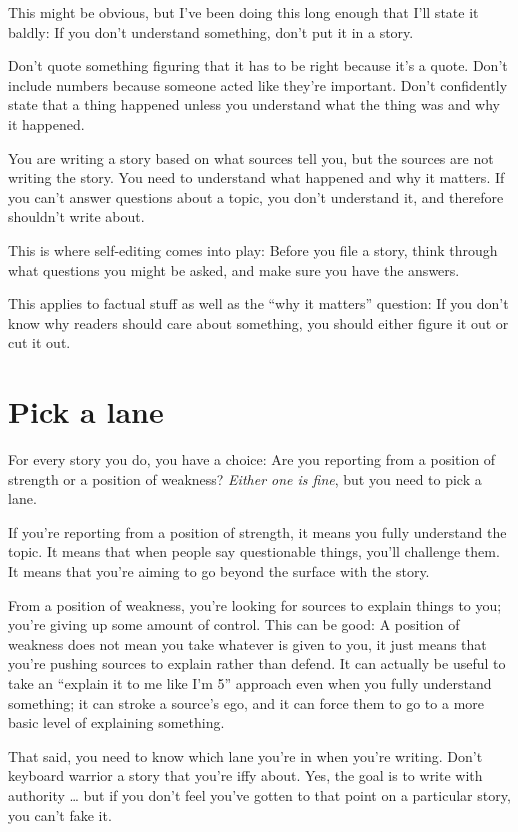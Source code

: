 \documentclass[
  11pt,
  american,
  letterpaperpaper,
  extrafontsizes,onecolumn,openright
  ]{memoir}
\newlength{\rf}
\begin{document}
This might be obvious, but I've been doing this long enough that I'll state it baldly: If you don't understand something, don't put it in a story.

Don't quote something figuring that it has to be right because it's a quote. Don't include numbers because someone acted like they're important. Don't confidently state that a thing happened unless you understand what the thing was and why it happened.

You are writing a story based on what sources tell you, but the sources are not writing the story. You need to understand what happened and why it matters. If you can't answer questions about a topic, you don't understand it, and therefore shouldn't write about.

This is where self-editing comes into play: Before you file a story, think through what questions you might be asked, and make sure you have the answers.

This applies to factual stuff as well as the \enquote{why it matters} question: If you don't know why readers should care about something, you should either figure it out or cut it out.

\hypertarget{pick-a-lane}{%
\section*{Pick a lane}\label{pick-a-lane}}

For every story you do, you have a choice: Are you reporting from a position of strength or a position of weakness? \emph{Either one is fine}, but you need to pick a lane.

If you're reporting from a position of strength, it means you fully understand the topic. It means that when people say questionable things, you'll challenge them. It means that you're aiming to go beyond the surface with the story.

From a position of weakness, you're looking for sources to explain things to you; you're giving up some amount of control. This can be good: A position of weakness does not mean you take whatever is given to you, it just means that you're pushing sources to explain rather than defend. It can actually be useful to take an \enquote{explain it to me like I'm 5} approach even when you fully understand something; it can stroke a source's ego, and it can force them to go to a more basic level of explaining something.

That said, you need to know which lane you're in when you're writing. Don't keyboard warrior a story that you're iffy about. Yes, the goal is to write with authority \ldots{} but if you don't feel you've gotten to that point on a particular story, you can't fake it.
\end{document}
